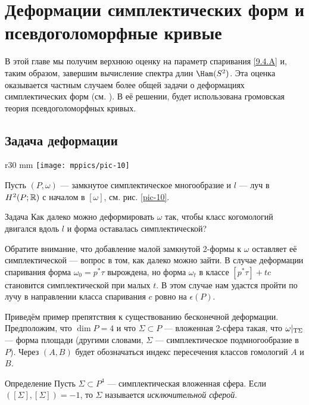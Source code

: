 \chapter[Деформации симплектических форм]{Деформации симплектических форм и псевдоголоморфные кривые}

В этой главе мы получим верхнюю оценку на параметр спаривания \ref{9.4.A} и, таким образом,
завершим вычисление спектра длин $\Ham(S^2)$.
Эта оценка оказывается частным случаем более общей задачи о деформациях симплектических форм (см. \cite{P7}).
В её решении, будет использована громовская теория псевдоголоморфных кривых.

\section{Задача деформации}

\begin{wrapfigure}[8]{r}{30 mm}
\vskip-6mm
\centering
\texttt{[image: mppics/pic-10]}
\caption{}\label{pic-10}
\vskip0mm
\end{wrapfigure}

Пусть $(P, \omega)$ — замкнутое симплектическое многообразие и $l$ — луч в $H^2 (P;\mathbb{R})$ с началом в $[\omega]$, см. рис. \ref{pic-10}.

\begin{ex*}{Задача}
Как далеко можно деформировать $\omega$ так, чтобы класс когомологий двигался вдоль $l$ и форма оставалась симплектической? 
\end{ex*}

Обратите внимание, что добавление малой замкнутой 2-формы к $\omega$ оставляет её симплектической — вопрос в том, как далеко можно зайти.
В случае деформации спаривания форма $\omega_0=p^\ast \tau$ вырождена, но форма $\omega_t$ в классе $[p^\ast \tau ] + tc$ становится симплектической при малых $t$.
В этом случае нам удастся пройти по лучу в направлении класса спаривания $c$ ровно на $\epsilon(P)$.

Приведём пример препятствия к существованию бесконечной деформации.
Предположим, что $\dim P = 4$ и что $\Sigma \subset P$ — вложенная 2-сфера такая, что $\omega|_{\mathrm{T} \Sigma}$ — форма площади (другими словами, $\Sigma$ — симплектическое подмногообразие в $P$).
Через $(A, B)$ будет обозначаться индекс пересечения классов гомологий $A$ и $B$.

\begin{ex*}{Определение}
Пусть $\Sigma \subset P^4$ — симплектическая вложенная сфера.
Если $([\Sigma], [\Sigma]) = -1$, то $\Sigma$ называется \emph{исключительной сферой}.
\end{ex*}

